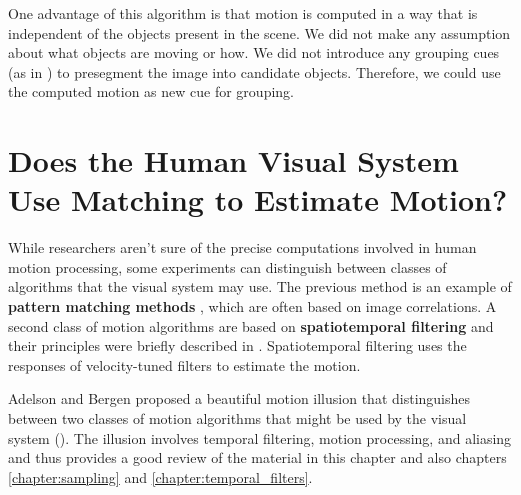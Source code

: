 
One advantage of this algorithm is that motion is computed in a way that is independent of the objects present in the scene. We did not make any assumption about what objects are moving or how. We did not introduce any grouping cues (as in \chap{\ref{chapter:perceptual_organization}}) to presegment the image into candidate objects. Therefore, we could use the computed motion as new cue for grouping.



\section{Does the Human Visual System Use Matching to Estimate Motion?}

While researchers aren't sure of the precise computations involved in human motion processing, some experiments can distinguish between classes of algorithms that the visual system may use.  The previous method is an example of {\bf pattern matching methods} \cite{Adelson85}, which are often based on image correlations. A second class of motion algorithms are based on {\bf spatiotemporal filtering} \cite{Adelson85} and their principles were briefly described in \chap{\ref{chapter:filter_banks}}. Spatiotemporal filtering uses the responses of velocity-tuned filters to estimate the motion.


Adelson and Bergen proposed a beautiful motion illusion that distinguishes between two classes of motion algorithms that might be used by the visual system (\fig{\ref{fig:motionIllusion1}}).  The illusion involves temporal filtering, motion processing, and aliasing and thus provides a good review of the material in this chapter and also chapters \ref{chapter:sampling} and \ref{chapter:temporal_filters}.



